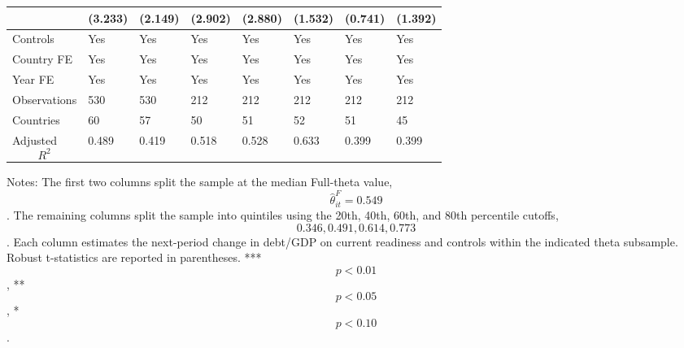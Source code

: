 \begin{table}[H]
\begin{threeparttable}
\begin{tabularx}{\textwidth}{lYYYYYYY}
  & (3.233) & (2.149) & (2.902) & (2.880) & (1.532) & (0.741) & (1.392) \\
\midrule
Controls & Yes & Yes & Yes & Yes & Yes & Yes & Yes \\
Country FE & Yes & Yes & Yes & Yes & Yes & Yes & Yes \\
Year FE & Yes & Yes & Yes & Yes & Yes & Yes & Yes \\
Observations & 530 & 530 & 212 & 212 & 212 & 212 & 212 \\
Countries & 60 & 57 & 50 & 51 & 52 & 51 & 45 \\
Adjusted $$R^2$$ & 0.489 & 0.419 & 0.518 & 0.528 & 0.633 & 0.399 & 0.399 \\
\bottomrule
\end{tabularx}
\begin{tablenotes}[flushleft]\footnotesize
\item Notes: The first two columns split the sample at the median Full-theta value, $$\widehat{\theta}^{F}_{it}=0.549$$. The remaining columns split the sample into quintiles using the 20th, 40th, 60th, and 80th percentile cutoffs, $$0.346, 0.491, 0.614, 0.773$$. Each column estimates the next-period change in debt/GDP on current readiness and controls within the indicated theta subsample. Robust t-statistics are reported in parentheses. *** $$p<0.01$$, ** $$p<0.05$$, * $$p<0.10$$.
\end{tablenotes}
\end{threeparttable}
\end{table}
